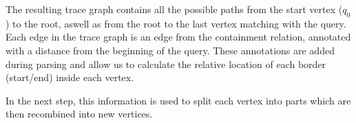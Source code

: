 The resulting trace graph contains all the possible paths from the start vertex ($q_0$) to the root, aswell as from the root to the last vertex matching with the query. Each edge in the trace graph is an edge from the containment relation, annotated with a distance from the beginning of the query. These annotations are added during parsing and allow us to calculate the relative location of each border (start/end) inside each vertex.

\noindent
In the next step, this information is used to split each vertex into parts which are then recombined into new vertices.


%


%
